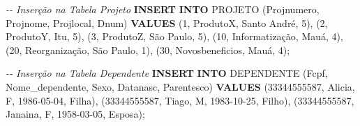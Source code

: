\documentclass[
]{article}
\newenvironment{Shaded}{\begin{snugshade}}{\end{snugshade}}
\newcommand{\CommentTok}[1]{\textcolor[rgb]{0.56,0.35,0.01}{\textit{#1}}}
\newcommand{\DecValTok}[1]{\textcolor[rgb]{0.00,0.00,0.81}{#1}}
\newcommand{\KeywordTok}[1]{\textcolor[rgb]{0.13,0.29,0.53}{\textbf{#1}}}
\newcommand{\NormalTok}[1]{#1}
\newcommand{\StringTok}[1]{\textcolor[rgb]{0.31,0.60,0.02}{#1}}
\begin{document}
\begin{Shaded}
\begin{Highlighting}[]
\CommentTok{{-}{-} Inserção na Tabela Projeto}
\KeywordTok{INSERT} \KeywordTok{INTO}\NormalTok{ PROJETO (Projnumero, Projnome, Projlocal, Dnum) }\KeywordTok{VALUES}
\NormalTok{(}\DecValTok{1}\NormalTok{, }\StringTok{\textquotesingle{}ProdutoX\textquotesingle{}}\NormalTok{, }\StringTok{\textquotesingle{}Santo André\textquotesingle{}}\NormalTok{, }\DecValTok{5}\NormalTok{),}
\NormalTok{(}\DecValTok{2}\NormalTok{, }\StringTok{\textquotesingle{}ProdutoY\textquotesingle{}}\NormalTok{, }\StringTok{\textquotesingle{}Itu\textquotesingle{}}\NormalTok{, }\DecValTok{5}\NormalTok{),}
\NormalTok{(}\DecValTok{3}\NormalTok{, }\StringTok{\textquotesingle{}ProdutoZ\textquotesingle{}}\NormalTok{, }\StringTok{\textquotesingle{}São Paulo\textquotesingle{}}\NormalTok{, }\DecValTok{5}\NormalTok{),}
\NormalTok{(}\DecValTok{10}\NormalTok{, }\StringTok{\textquotesingle{}Informatização\textquotesingle{}}\NormalTok{, }\StringTok{\textquotesingle{}Mauá\textquotesingle{}}\NormalTok{, }\DecValTok{4}\NormalTok{),}
\NormalTok{(}\DecValTok{20}\NormalTok{, }\StringTok{\textquotesingle{}Reorganização\textquotesingle{}}\NormalTok{, }\StringTok{\textquotesingle{}São Paulo\textquotesingle{}}\NormalTok{, }\DecValTok{1}\NormalTok{),}
\NormalTok{(}\DecValTok{30}\NormalTok{, }\StringTok{\textquotesingle{}Novosbeneficios\textquotesingle{}}\NormalTok{, }\StringTok{\textquotesingle{}Mauá\textquotesingle{}}\NormalTok{, }\DecValTok{4}\NormalTok{);}
\end{Highlighting}
\end{Shaded}

\begin{Shaded}
\begin{Highlighting}[]
\CommentTok{{-}{-} Inserção na Tabela Dependente}
\KeywordTok{INSERT} \KeywordTok{INTO}\NormalTok{ DEPENDENTE (Fcpf, Nome\_dependente, Sexo, Datanasc, Parentesco) }\KeywordTok{VALUES}
\NormalTok{(}\StringTok{\textquotesingle{}33344555587\textquotesingle{}}\NormalTok{, }\StringTok{\textquotesingle{}Alicia\textquotesingle{}}\NormalTok{, }\StringTok{\textquotesingle{}F\textquotesingle{}}\NormalTok{, }\StringTok{\textquotesingle{}1986{-}05{-}04\textquotesingle{}}\NormalTok{, }\StringTok{\textquotesingle{}Filha\textquotesingle{}}\NormalTok{),}
\NormalTok{(}\StringTok{\textquotesingle{}33344555587\textquotesingle{}}\NormalTok{, }\StringTok{\textquotesingle{}Tiago\textquotesingle{}}\NormalTok{, }\StringTok{\textquotesingle{}M\textquotesingle{}}\NormalTok{, }\StringTok{\textquotesingle{}1983{-}10{-}25\textquotesingle{}}\NormalTok{, }\StringTok{\textquotesingle{}Filho\textquotesingle{}}\NormalTok{),}
\NormalTok{(}\StringTok{\textquotesingle{}33344555587\textquotesingle{}}\NormalTok{, }\StringTok{\textquotesingle{}Janaina\textquotesingle{}}\NormalTok{, }\StringTok{\textquotesingle{}F\textquotesingle{}}\NormalTok{, }\StringTok{\textquotesingle{}1958{-}03{-}05\textquotesingle{}}\NormalTok{, }\StringTok{\textquotesingle{}Esposa\textquotesingle{}}\NormalTok{);}
\end{Highlighting}
\end{Shaded}
\end{document}
